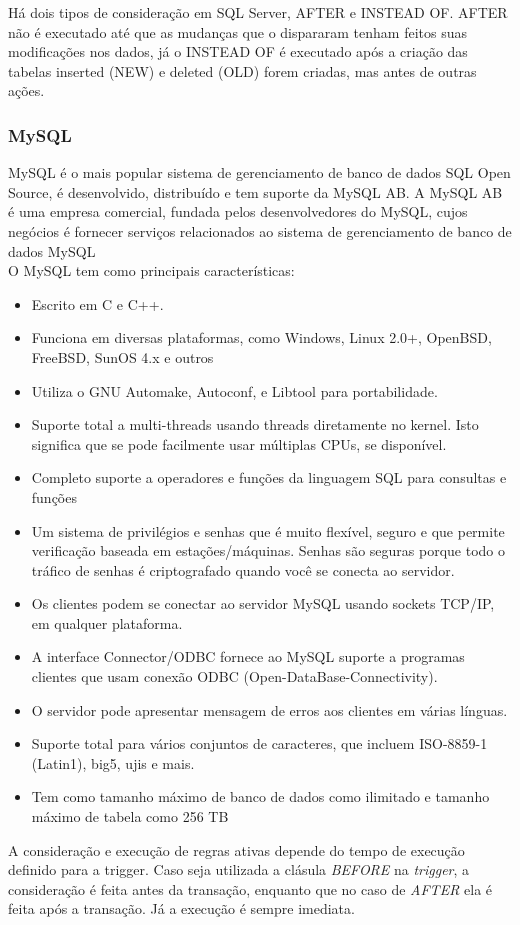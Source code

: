 \documentclass[conference]{IEEEtran}
\begin{document}
	  Há dois tipos de consideração em SQL Server, AFTER e INSTEAD OF. AFTER não é executado até que as mudanças que o dispararam tenham feitos suas modificações nos dados, já o INSTEAD OF é executado após a criação das tabelas inserted (NEW) e deleted (OLD) forem criadas, mas antes de outras ações.\cite{caracteristica-mssql} \cite{caracteristica-mssql2}

    \subsubsection{MySQL}
	  MySQL é o mais popular sistema de gerenciamento de banco de dados SQL Open Source, é desenvolvido, distribuído e tem suporte da MySQL AB. A MySQL AB é uma empresa comercial, fundada pelos desenvolvedores do MySQL, cujos negócios é fornecer serviços relacionados ao sistema de gerenciamento de banco de dados MySQL\cite{mysql-site}\\

	  
    O MySQL tem como principais características:
    \begin{itemize}
      \item Escrito em C e C++.
      \item Funciona em diversas plataformas, como Windows, Linux 2.0+, OpenBSD, FreeBSD, SunOS 4.x e outros
      \item Utiliza o GNU Automake, Autoconf, e Libtool para portabilidade.
      \item Suporte total a multi-threads usando threads diretamente no kernel. Isto significa que se pode facilmente usar múltiplas CPUs, se disponível.
      \item Completo suporte a operadores e funções da linguagem SQL para consultas e funções
      \item Um sistema de privilégios e senhas que é muito flexível, seguro e que permite verificação baseada em estações/máquinas. Senhas são seguras porque todo o tráfico de senhas é criptografado quando você se conecta ao servidor.
      \item Os clientes podem se conectar ao servidor MySQL usando sockets TCP/IP, em qualquer plataforma.
      \item A interface Connector/ODBC fornece ao MySQL suporte a programas clientes que usam conexão ODBC (Open-DataBase-Connectivity). 
      \item O servidor pode apresentar mensagem de erros aos clientes em várias línguas. 
      \item Suporte total para vários conjuntos de caracteres, que incluem ISO-8859-1 (Latin1), big5, ujis e mais.
      \item Tem como tamanho máximo de banco de dados como ilimitado e tamanho máximo de tabela como 256 TB
    \end{itemize}
    A consideração e execução de regras ativas depende do tempo de execução definido para a trigger. Caso seja utilizada a clásula \textit{BEFORE} na \textit{trigger}, a consideração é feita antes da transação, enquanto que no caso de \textit{AFTER} ela é feita após a transação. Já a execução é sempre imediata.\cite{caracteristica-myssql}
\end{document}
